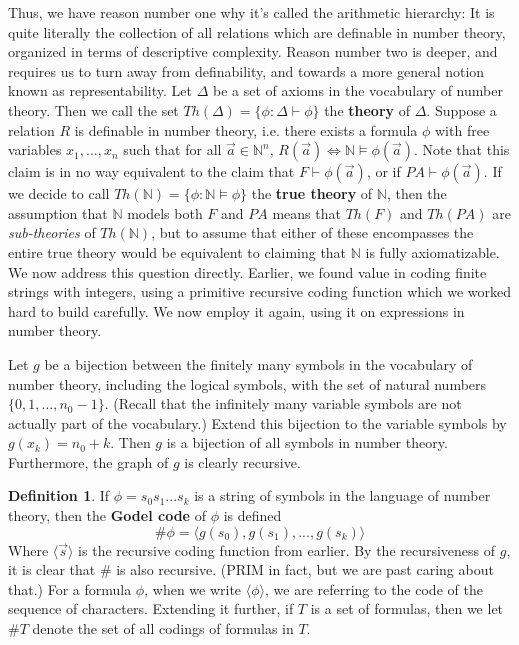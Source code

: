 \documentclass{article}
\theoremstyle{definition}
\newtheorem{definition}{Definition}[section]
\theoremstyle{plain}
\theoremstyle{theorem}
\begin{document}
Thus, we have reason number one why it's called the arithmetic hierarchy: It is quite literally the collection of all relations which are definable in number theory, organized in terms of descriptive complexity. Reason number two is deeper, and requires us to turn away from definability, and towards a more general notion known as representability. Let $\Delta$ be a set of axioms in the vocabulary of number theory. Then we call the set $Th(\Delta) = \{\phi: \Delta \vdash \phi \}$ the \textbf{theory} of $\Delta$. Suppose a relation $R$ is definable in number theory, i.e. there exists a formula $\phi$ with free variables $x_1,...,x_n$ such that for all $\vec{a} \in \mathbb{N}^n$, $R(\vec{a}) \iff \mathbb{N} \models \phi(\vec{a})$. Note that this claim is in no way equivalent to the claim that $F \vdash \phi(\vec{a})$, or if $PA \vdash \phi(\vec{a})$. If we decide to call $Th(\mathbb{N}) = \{\phi: \mathbb{N} \models \phi\}$ the \textbf{true theory} of $\mathbb{N}$, then the assumption that $\mathbb{N}$ models both $F$ and $PA$ means that $Th(F)$ and $Th(PA)$ are \textit{sub-theories} of $Th(\mathbb{N})$, but to assume that either of these encompasses the entire true theory would be equivalent to claiming that $\mathbb{N}$ is fully axiomatizable. We now address this question directly.
Earlier, we found value in coding finite strings with integers, using a primitive recursive coding function which we worked hard to build carefully. We now employ it again, using it on expressions in number theory.
\par Let $g$ be a bijection between the finitely many symbols in the vocabulary of number theory, including the logical symbols, with the set of natural numbers $\{0,1,...,n_0-1\}$. (Recall that the infinitely many variable symbols are not actually part of the vocabulary.) Extend this bijection to the variable symbols by $g(x_k) = n_0+k$. Then $g$ is a bijection of all symbols in number theory. Furthermore, the graph of $g$ is clearly recursive. 
\begin{definition}
    If $\phi = s_0s_1...s_k$ is a string of symbols in the language of number theory, then the \textbf{Godel code} of $\phi$ is defined 
    \[\#\phi = \langle g(s_0),g(s_1),...,g(s_k) \rangle \]
    Where $\langle \vec{s} \rangle$ is the recursive coding function from earlier. By the recursiveness of $g$, it is clear that $\#$ is also recursive. (PRIM in fact, but we are past caring about that.) For a formula $\phi$, when we write $\langle \phi \rangle$, we are referring to the code of the sequence of characters. Extending it further, if $T$ is a set of formulas, then we let $\#T$ denote the set of all codings of formulas in $T$.
\end{definition}
\end{document}
